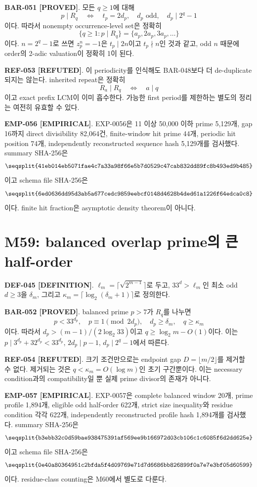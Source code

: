 \documentclass[11pt]{article}
\newcommand{\claimstatus}[2]{\textbf{#1 [#2]}}
\begin{document}
\claimstatus{BAR-051}{PROVED}.
모든 \(q\ge1\)에 대해
\[
p\mid R_q
\quad\Longleftrightarrow\quad
t_p=2d_p,\quad d_p\text{ odd},\quad d_p\mid2^q-1
\tag{M58.2}
\]
이다. 따라서 nonempty occurrence-level set은 정확히
\[
\{q\ge1:p\mid R_q\}
=\{a_p,2a_p,3a_p,\ldots\}
\tag{M58.3}
\]
이다. \(n=2^q-1\)로 쓰면 \(z_p^n=-1\)은
\(t_p\mid2n\)이고 \(t_p\nmid n\)인 것과 같고, odd \(n\) 때문에
order의 2-adic valuation이 정확히 1이 된다.

\claimstatus{REF-053}{REFUTED}.
이 periodicity를 인식해도 BAR-048보다 더 de-duplicate되지는 않는다.
inherited repeat은 정확히
\[
R_a\mid R_q\quad\Longleftrightarrow\quad a\mid q
\tag{M58.4}
\]
이고 exact prefix LCM이 이미 흡수한다. 가능한 first period를 제한하는
별도의 정리는 여전히 유효할 수 있다.

\claimstatus{EMP-056}{EMPIRICAL}.
EXP-0056은 11 이상 50,000 이하 prime 5,129개, gap 16까지 direct
divisibility 82,064건, finite-window hit prime 44개, periodic hit position
74개, independently reconstructed sequence hash 5,129개를 검사했다.
summary SHA-256은
\[
\texttt{\seqsplit{41eb014eb5071fae4c7a33a98f66e5b7d0529c47cab832dd89fc8b493ed9b485}}
\]
이고 schema file SHA-256은
\[
\texttt{\seqsplit{6ed0636dd95d3ab5a677cedc9859eebcf0148d4628b4ded61a1226f64edca0c8}}
\]
이다. finite hit fraction은 asymptotic density theorem이 아니다.

\section{M59: balanced overlap prime의 큰 half-order}

\claimstatus{DEF-045}{DEFINITION}.
\(\ell_m=\lceil\sqrt{2^{m-1}}\rceil\)로 두고,
\(33^d>\ell_m\)인 최소 odd \(d\ge3\)을 \(\delta_m\), 그리고
\(\kappa_m=\lceil\log_2(\delta_m+1)\rceil\)로 정의한다.

\claimstatus{BAR-052}{PROVED}.
balanced prime \(p>7\)가 \(R_q\)를 나누면
\[
p<33^{d_p},\quad p\equiv1\pmod{2d_p},\quad
d_p\ge\delta_m,\quad q\ge\kappa_m
\tag{M59.1}
\]
이다. 따라서 \(d_p>(m-1)/(2\log_2 33)\)이고
\(q\ge\log_2m-O(1)\)이다. 이는
\(p\mid3^{d_p}+32^{d_p}<33^{d_p}\),
\(2d_p\mid p-1\), \(d_p\mid2^q-1\)에서 따른다.

\claimstatus{REF-054}{REFUTED}.
크기 조건만으로는 endpoint gap \(D=\lfloor m/2\rfloor\)를 제거할 수
없다. 제거되는 것은 \(q<\kappa_m=O(\log m)\)인 초기 구간뿐이다.
이는 necessary condition과의 compatibility일 뿐 실제 prime divisor의
존재가 아니다.

\claimstatus{EMP-057}{EMPIRICAL}.
EXP-0057은 complete balanced window 20개, prime profile 1,894개,
eligible odd half-order 622개, strict size inequality와 residue
condition 각각 622개, independently reconstructed profile hash
1,894개를 검사했다. summary SHA-256은
\[
\texttt{\seqsplit{b3ebb32c0d59bae938475391af569ee9b166972d03cb106c1c6085f6d2dd625e}}
\]
이고 schema file SHA-256은
\[
\texttt{\seqsplit{0e40a80364951c2bfda5f4d09769e71d7d6686bb826899f0a7e7e3bf05d60599}}
\]
이다. residue-class counting은 M60에서 별도로 다룬다.
\end{document}
